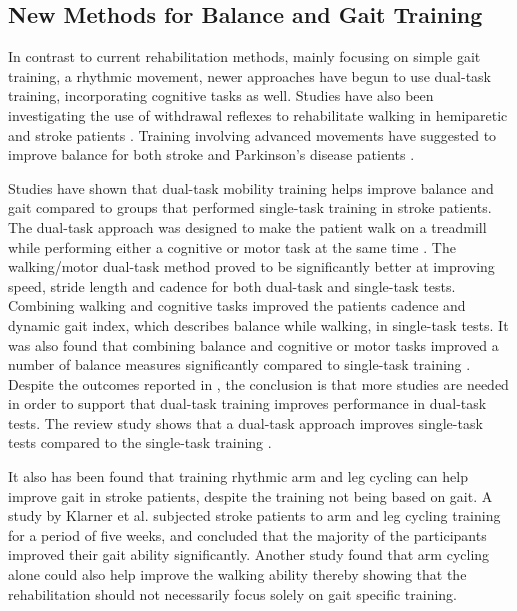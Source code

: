 \subsection{New Methods for Balance and Gait Training}

In contrast to current rehabilitation methods, mainly focusing on simple gait training, a rhythmic movement, newer approaches have begun to use dual-task training, incorporating cognitive tasks as well. Studies have also been investigating the use of withdrawal reflexes to rehabilitate walking in hemiparetic and stroke patients \cite{Emborg2010,Spaich2014}. Training involving advanced movements have suggested to improve balance for both stroke and Parkinson's disease patients \cite{Ding2012,Winser2018}.

Studies have shown that dual-task mobility training helps improve balance and gait compared to groups that performed single-task training in stroke patients. The dual-task approach was designed to make the patient walk on a treadmill while performing either a cognitive or motor task at the same time \cite{He2018}.
The walking/motor dual-task method proved to be significantly better at improving speed, stride length and cadence for both dual-task and single-task tests. Combining walking and cognitive tasks improved the patients cadence and dynamic gait index, which describes balance while walking, in single-task tests. It was also found that combining balance and cognitive or motor tasks improved a number of balance measures significantly compared to single-task training \cite{He2018}.
Despite the outcomes reported in \cite{He2018}, the conclusion is that more studies are needed in order to support that dual-task training improves performance in dual-task tests. The review study shows that a dual-task approach improves single-task tests compared to the single-task training \cite{He2018}.

It also has been found that training rhythmic arm and leg cycling can help improve gait in stroke patients, despite the training not being based on gait. A study by Klarner et al. \cite{Klarner2016} subjected stroke patients to arm and leg cycling training for a period of five weeks, and concluded that the majority of the participants improved their gait ability significantly. Another study found that arm cycling alone could also help improve the walking ability \cite{Kaupp2018} thereby showing that the rehabilitation should not necessarily focus solely on gait specific training.

